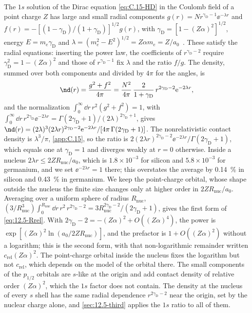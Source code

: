The $1s$ solution of the Dirac equation \cref{eq:C.15-HD} in the Coulomb field of a point charge $Z$ has large and small radial components $g(r) = N r^{\gamma_{\mathrm{D}} - 1}\ee^{-\lambda r}$ and $f(r) = -[(1 - \gamma_{\mathrm{D}})/(1 + \gamma_{\mathrm{D}})]^{1/2}g(r)$, with $\gamma_{\mathrm{D}} = [1 - (Z\alpha)^2]^{1/2}$, energy $E = m_e\gamma_{\mathrm{D}}$ and $\lambda = (m_e^2 - E^2)^{1/2} = Z\alpha m_e = Z/a_0$~\cite{bjorken1964relativistic}. These satisfy the radial equations: inserting the power law, the coefficients of $r^{\gamma_{\mathrm{D}} - 2}$ require $\gamma_{\mathrm{D}}^2 = 1 - (Z\alpha)^2$ and those of $r^{\gamma_{\mathrm{D}} - 1}$ fix $\lambda$ and the ratio $f/g$. The density, summed over both components and divided by $4\pi$ for the angles, is
\begin{equation*}
  \nd(r) = \frac{g^2 + f^2}{4\pi} = \frac{N^2}{4\pi}\,\frac{2}{1 + \gamma_{\mathrm{D}}}\,r^{2\gamma_{\mathrm{D}} - 2}\ee^{-2\lambda r} ,
\end{equation*}
and the normalization $\int_0^\infty\dd r\,r^2(g^2 + f^2) = 1$, with $\int_0^\infty\dd r\,r^{2\gamma_{\mathrm{D}}}\ee^{-2\lambda r} = \Gamma(2\gamma_{\mathrm{D}} + 1)/(2\lambda)^{2\gamma_{\mathrm{D}} + 1}$, gives $\nd(r) = (2\lambda)^3(2\lambda r)^{2\gamma_{\mathrm{D}} - 2}\ee^{-2\lambda r}/[4\pi\,\Gamma(2\gamma_{\mathrm{D}} + 1)]$. The nonrelativistic contact density is $\lambda^3/\pi$, \cref{app:C.15}, so the ratio is $2(2\lambda r)^{2\gamma_{\mathrm{D}} - 2}\ee^{-2\lambda r}/\Gamma(2\gamma_{\mathrm{D}} + 1)$, which equals one at $\gamma_{\mathrm{D}} = 1$ and diverges weakly at $r = 0$ otherwise. Inside a nucleus $2\lambda r \le 2ZR_{\mathrm{nuc}}/a_0$, which is $1.8\times10^{-3}$ for silicon and $5.8\times10^{-3}$ for germanium, and we set $\ee^{-2\lambda r} = 1$ there; this overstates the average by \SI{0.14}{\percent} in silicon and \SI{0.43}{\percent} in germanium. We keep the point-charge orbital, whose shape outside the nucleus the finite size changes only at higher order in $2ZR_{\mathrm{nuc}}/a_0$. Averaging over a uniform sphere of radius $R_{\mathrm{nuc}}$, $(3/R_{\mathrm{nuc}}^3)\int_0^{R_{\mathrm{nuc}}}\dd r\,r^2\,r^{2\gamma_{\mathrm{D}} - 2} = 3R_{\mathrm{nuc}}^{2\gamma_{\mathrm{D}} - 2}/(2\gamma_{\mathrm{D}} + 1)$, gives the first form of \cref{eq:12.5-Rrel}. With $2\gamma_{\mathrm{D}} - 2 = -(Z\alpha)^2 + O((Z\alpha)^4)$, the power is $\exp[(Z\alpha)^2\ln(a_0/2ZR_{\mathrm{nuc}})]$, and the prefactor is $1 + O((Z\alpha)^2)$ without a logarithm; this is the second form, with that non-logarithmic remainder written $c_{\mathrm{rel}}(Z\alpha)^2$. The point-charge orbital inside the nucleus fixes the logarithm but not $c_{\mathrm{rel}}$, which depends on the model of the orbital there. The small components of the $p_{1/2}$ orbitals are $s$-like at the origin and add contact density of relative order $(Z\alpha)^2$, which the $1s$ factor does not contain. The density at the nucleus of every $s$ shell has the same radial dependence $r^{2\gamma_{\mathrm{D}} - 2}$ near the origin, set by the nuclear charge alone, and \cref{sec:12.5-third} applies the $1s$ ratio to all of them.
